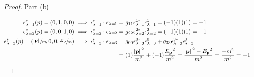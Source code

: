 \documentclass[letterpaper]{article}
\theoremstyle{definition}
\begin{document}
\begin{proof}Part (b)



  \begin{align*}
    \qq*{} \epsilon_{\lambda=1}^*(p)=(0,1,0,0)\implies\epsilon_{\lambda=1}^*\cdot\epsilon_{\lambda=1}                                     & =g_{11}\epsilon_{\lambda=1}^{1*}\epsilon_{\lambda=1}^1=(-1)(1)(1)
    =-1                                                                                                                                                                                                                                                                       \\
    \epsilon_{\lambda=2}^*(p)=(0,0,1,0)\implies\epsilon_{\lambda=2}^*\cdot\epsilon_{\lambda=2}                                            & =g_{22}\epsilon_{\lambda=2}^{2*}\epsilon_{\lambda=2}^2=(-1)(1)(1)
    =-1                                                                                                                                                                                                                                                                       \\
    \epsilon_{\lambda=3}^*(p)=(\sfrac{\abs*{\vb{p}}}{m},0,0,\sfrac{E_{\vb{p}}}{m})\implies\epsilon_{\lambda=3}^*\cdot\epsilon_{\lambda=3} & =g_{00}\epsilon_{\lambda=3}^{0*}\epsilon_{\lambda=3}^0+g_{33}\epsilon_{\lambda=3}^{3*}\epsilon_{\lambda=3}^3                      \\
                                                                                                                                          & =(1)\frac{{\abs*{\vb{p}}}^2}{m^2}+(-1)\frac{{E_{\vb{p}}}^2}{m^2}=\frac{{\abs*{\vb{p}}}^2-{E_{\vb{p}}}^2}{m^2}=\frac{-m^2}{m^2}=-1 \\
  \end{align*}
\end{proof}
\end{document}
